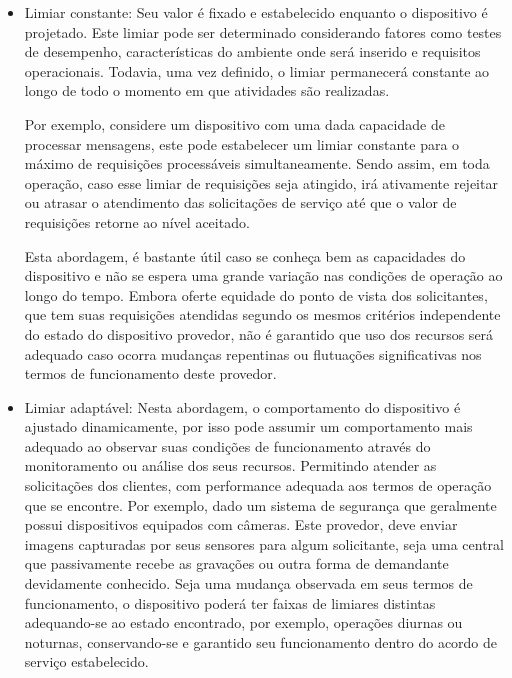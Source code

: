 \begin{itemize}
    \item Limiar constante: Seu valor é fixado e estabelecido enquanto o dispositivo é projetado. Este limiar pode ser determinado considerando fatores como testes de desempenho, características do ambiente onde será inserido e requisitos operacionais. Todavia, uma vez definido, o limiar permanecerá constante ao longo de todo o momento em que  atividades são realizadas.
    
    Por exemplo, considere um dispositivo com uma dada capacidade de processar mensagens, este pode estabelecer um limiar constante para o máximo de requisições processáveis simultaneamente. Sendo assim, em toda operação, caso esse limiar de requisições seja atingido, irá ativamente rejeitar ou atrasar o atendimento das solicitações de serviço até que o valor de requisições retorne ao nível aceitado. 
    
    Esta abordagem, é bastante útil caso se conheça bem as capacidades do dispositivo e não se espera uma grande variação nas condições de operação ao longo do tempo. Embora oferte equidade do ponto de vista dos solicitantes, que tem suas requisições atendidas segundo os mesmos critérios independente do estado do dispositivo provedor, não é garantido que uso dos recursos será adequado caso ocorra mudanças repentinas ou flutuações significativas nos termos de funcionamento deste provedor.
    
    \item Limiar adaptável: Nesta abordagem, o comportamento do dispositivo é ajustado dinamicamente, por isso pode assumir um comportamento mais adequado ao observar suas condições de funcionamento através do monitoramento ou análise dos seus recursos. Permitindo atender as solicitações dos clientes, com performance adequada aos termos de operação que se encontre. Por exemplo, dado um sistema de segurança que geralmente possui dispositivos equipados com câmeras. Este provedor, deve enviar imagens capturadas por seus sensores para algum solicitante, seja uma central que passivamente recebe as gravações ou outra forma de demandante devidamente conhecido. Seja uma mudança observada em seus termos de funcionamento, o dispositivo poderá ter faixas de limiares distintas adequando-se ao estado encontrado, por exemplo, operações diurnas ou noturnas, conservando-se e garantido seu funcionamento dentro do acordo de serviço estabelecido.   
    
\end{itemize}

